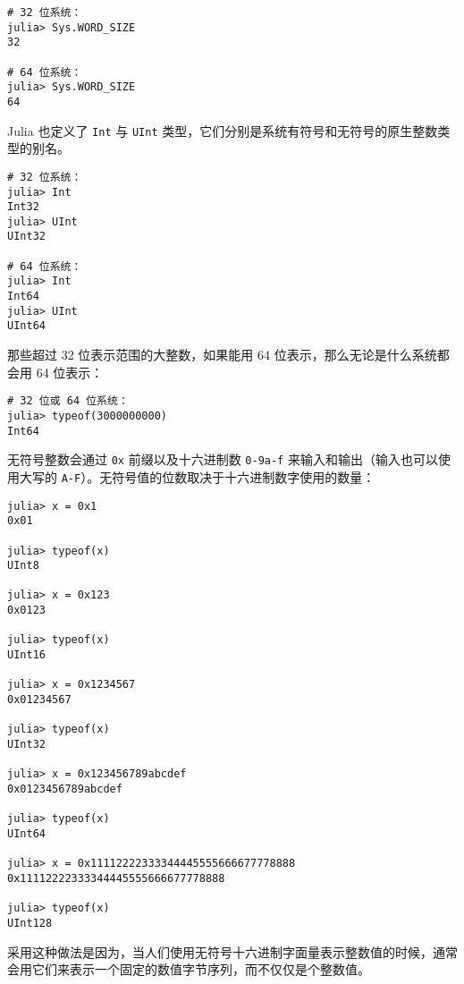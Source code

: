 \begin{verbatim}
# 32 位系统：
julia> Sys.WORD_SIZE
32

# 64 位系统：
julia> Sys.WORD_SIZE
64
\end{verbatim}



Julia 也定义了 \texttt{Int} 与 \texttt{UInt} 类型，它们分别是系统有符号和无符号的原生整数类型的别名。




\begin{verbatim}
# 32 位系统：
julia> Int
Int32
julia> UInt
UInt32

# 64 位系统：
julia> Int
Int64
julia> UInt
UInt64
\end{verbatim}



那些超过 32 位表示范围的大整数，如果能用 64 位表示，那么无论是什么系统都会用 64 位表示：




\begin{verbatim}
# 32 位或 64 位系统：
julia> typeof(3000000000)
Int64
\end{verbatim}



无符号整数会通过 \texttt{0x} 前缀以及十六进制数 \texttt{0-9a-f} 来输入和输出（输入也可以使用大写的 \texttt{A-F}）。无符号值的位数取决于十六进制数字使用的数量：




\begin{verbatim}
julia> x = 0x1
0x01

julia> typeof(x)
UInt8

julia> x = 0x123
0x0123

julia> typeof(x)
UInt16

julia> x = 0x1234567
0x01234567

julia> typeof(x)
UInt32

julia> x = 0x123456789abcdef
0x0123456789abcdef

julia> typeof(x)
UInt64

julia> x = 0x11112222333344445555666677778888
0x11112222333344445555666677778888

julia> typeof(x)
UInt128
\end{verbatim}



采用这种做法是因为，当人们使用无符号十六进制字面量表示整数值的时候，通常会用它们来表示一个固定的数值字节序列，而不仅仅是个整数值。



